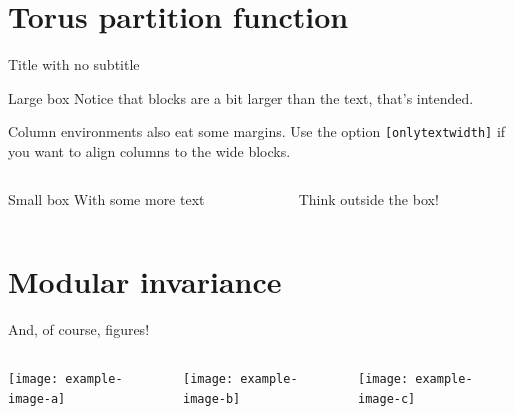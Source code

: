 \documentclass[11pt,aspectratio=169]{beamer}
\begin{document}
\section{Torus partition function}

\begin{frame}{Title with no subtitle}

	\begin{block}{Large box}
	Notice that blocks are a bit larger than the text, that's intended.
	\end{block}
	
	Column environments also eat some margins. Use the option \texttt{[onlytextwidth]} if you want to align columns to the wide blocks.
	
	\begin{columns}[onlytextwidth]
	\begin{column}{0.45\textwidth}
		\begin{block}{Small box}
		With some more text
		\end{block}
	\end{column}
	\begin{column}{0.5\textwidth}
		Think outside the box!
	\end{column}
	\end{columns}

\end{frame}

\section{Modular invariance}

\begin{frame}{And, of course, figures!}
	
	\begin{columns}
		\begin{column}{0.33\textwidth}
			\texttt{[image: example-image-a]}
		\end{column}
		\begin{column}{0.33\textwidth}
			\texttt{[image: example-image-b]}
		\end{column}
		\begin{column}{0.33\textwidth}
			\texttt{[image: example-image-c]}
		\end{column}
	\end{columns}

\end{frame}
\end{document}
